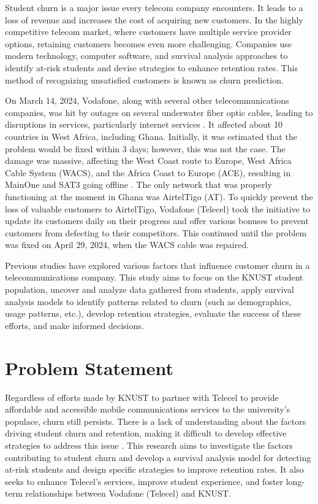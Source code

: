 \documentclass[doublespacing]{report} [12px]%
\begin{document}

Student churn is a major issue every telecom company encounters. It leads to a loss of revenue and increases the cost of acquiring new customers. In the highly competitive telecom market, where customers have multiple service provider options, retaining customers becomes even more challenging. Companies use modern technology, computer software, and survival analysis approaches to identify at-risk students and devise strategies to enhance retention rates. This method of recognizing unsatisfied customers is known as churn prediction.

On March 14, 2024, Vodafone, along with several other telecommunications companies, was hit by outages on several underwater fiber optic cables, leading to disruptions in services, particularly internet services \cite{ghanaweb2023}. It affected about 10 countries in West Africa, including Ghana. Initially, it was estimated that the problem would be fixed within 3 days; however, this was not the case. The damage was massive, affecting the West Coast route to Europe, West Africa Cable System (WACS), and the Africa Coast to Europe (ACE), resulting in MainOne and SAT3 going offline \cite{apnews2023}. The only network that was properly functioning at the moment in Ghana was AirtelTigo (AT). To quickly prevent the loss of valuable customers to AirtelTigo, Vodafone (Telecel) took the initiative to update its customers daily on their progress and offer various bonuses to prevent customers from defecting to their competitors. This continued until the problem was fixed on April 29, 2024, when the WACS cable was repaired.

Previous studies have explored various factors that influence customer churn in a telecommunications company. This study aims to focus on the KNUST student population, uncover and analyze data gathered from students, apply survival analysis models to identify patterns related to churn (such as demographics, usage patterns, etc.), develop retention strategies, evaluate the success of these efforts, and make informed decisions.

\section{Problem Statement}

Regardless of efforts made by KNUST to partner with Telecel to provide affordable and accessible mobile communications services to the university’s populace, churn still persists. There is a lack of understanding about the factors driving student churn and retention, making it difficult to develop effective strategies to address this issue \cite{kapur2018}. This research aims to investigate the factors contributing to student churn and develop a survival analysis model for detecting at-risk students and design specific strategies to improve retention rates. It also seeks to enhance Telecel’s services, improve student experience, and foster long-term relationships between Vodafone (Telecel) and KNUST.
\end{document}

